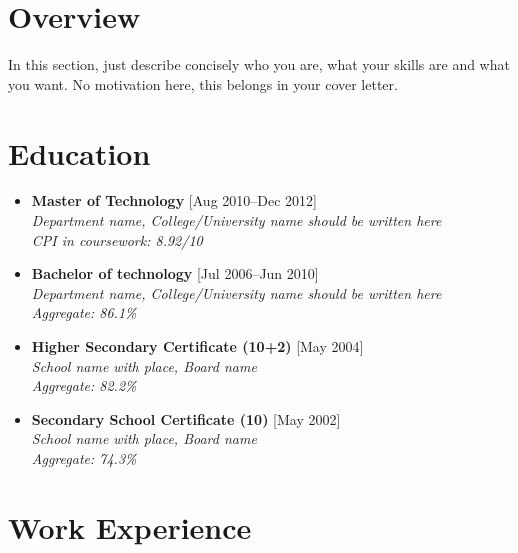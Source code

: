 \documentclass[11pt,a4paper]{moderncv}
\begin{document}
\hskip-2.5cm\makecvtitle

\section{Overview}
In this section, just describe concisely who you are, what your skills are and what you want. No motivation here, this belongs in your cover letter.

\section{Education}

\begin{itemize}

\item \textbf{Master of Technology} \hfill [Aug 2010--Dec 2012]\\
\textit{Department name, College/University name should be written here\\ 
CPI in coursework: 8.92/10}

\item \textbf{Bachelor of technology} \hfill [Jul 2006--Jun 2010]\\
\textit{Department name, College/University name should be written here\\ 
Aggregate: 86.1\%}

\item \textbf{Higher Secondary Certificate (10+2)} \hfill [May 2004]\\
\textit{School name with place, Board name \\ 
Aggregate: 82.2\%}

\item \textbf{Secondary School Certificate (10)} \hfill [May 2002]\\
\textit{School name with place, Board name\\ 
Aggregate: 74.3\%}

\end{itemize}

\section{Work Experience}
\end{document}

